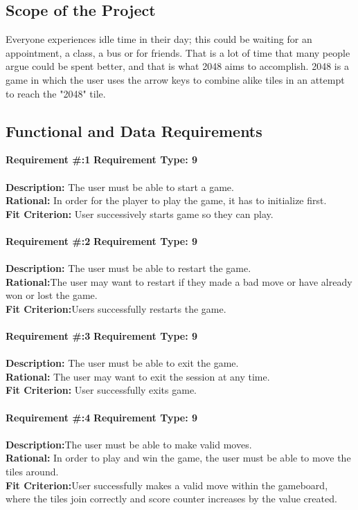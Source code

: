 \documentclass[12pt]{article}
\begin{document}
\subsection{Scope of the Project}
Everyone experiences idle time in their day; this could be waiting for an appointment, a class, a bus or for friends. That is a lot of time that many people argue could be spent better, and that is what 2048 aims to accomplish. 2048 is a game in which the user uses the arrow keys to combine alike tiles in an attempt to reach the "2048" tile.\\

\subsection{Functional and Data Requirements}
\textbf {Requirement \#:1} \indent\textbf {Requirement Type: 9}\\\\
\textbf {Description:} The user must be able to start a game.\\
\textbf {Rational:} In order for the player to play the game, it has to initialize first.\\
\textbf {Fit Criterion:} User successively starts game so they can play. \\\\

\textbf {Requirement \#:2} \indent\textbf {Requirement Type: 9} \\\\
\textbf {Description:} The user must be able to restart the game.\\
\textbf {Rational:}The user may want to restart if they made a bad move or have already won or lost the game. \\
\textbf {Fit Criterion:}Users successfully restarts the game. \\\\

\textbf {Requirement \#:3} \indent\textbf {Requirement Type: 9}\\\\
\textbf {Description:} The user must be able to exit the game.\\
\textbf {Rational:} The user may want to exit the session at any time.\\
\textbf {Fit Criterion:} User successfully exits game. \\\\

\textbf {Requirement \#:4} \indent\textbf {Requirement Type: 9}\\\\
\textbf {Description:}The user must be able to make valid moves. \\
\textbf {Rational:} In order to play and win the game, the user must be able to move the tiles around. \\
\textbf {Fit Criterion:}User successfully makes a valid move within the gameboard, where the tiles join correctly and score counter increases by the value created. \\\\
\end{document}
